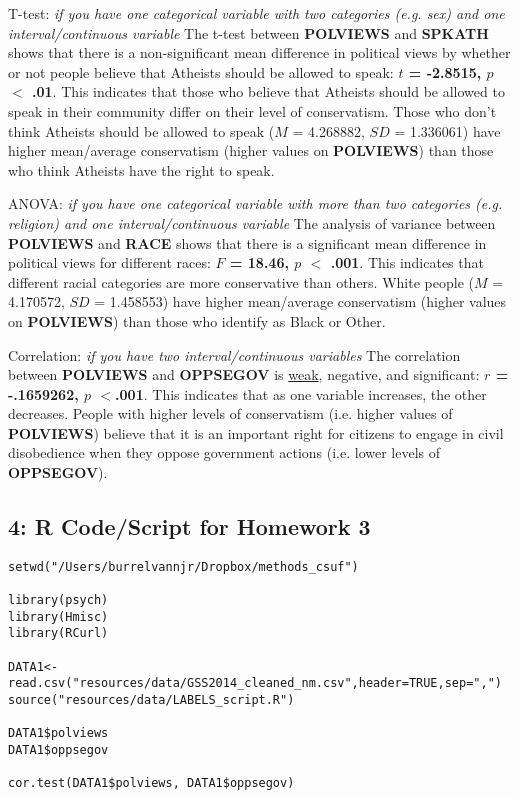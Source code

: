 \documentclass{article}
\begin{document}
T-test: {\it{if you have one categorical variable with two categories (e.g. sex) and one interval/continuous variable}} \newline \newline
The t-test between \textbf{POLVIEWS} and \textbf{SPKATH} shows that there is a non-significant mean difference in political views by whether or not people believe that Atheists should be allowed to speak: \textbf{$t$ = -2.8515, $p$ $< $ .01}. This indicates that those who believe that Atheists should be allowed to speak in their community differ on their level of conservatism. Those who don't think Atheists should be allowed to speak ($M$ = 4.268882, $SD$ = 1.336061) have higher mean/average conservatism (higher values on \textbf{POLVIEWS}) than those who think Atheists have the right to speak.\newline

ANOVA: {\it{if you have one categorical variable with more than two categories (e.g. religion) and one interval/continuous variable}} \newline \newline
The analysis of variance between \textbf{POLVIEWS} and \textbf{RACE} shows that there is a significant mean difference in political views for different races: \textbf{$F$ = 18.46, $p$ $< $ .001}. This indicates that different racial categories are more conservative than others. White people ($M$ = 4.170572, $SD$ = 1.458553) have higher mean/average conservatism (higher values on \textbf{POLVIEWS}) than those who identify as Black or Other.\newline

Correlation: {\it{if you have two interval/continuous variables}} \newline \newline
The correlation between \textbf{POLVIEWS} and \textbf{OPPSEGOV} is \href{http://www.psychology.emory.edu/clinical/bliwise/Tutorials/SCATTER/scatterplots/effect.htm}{weak}, negative, and significant: \textbf{$r$ = -.1659262, $p$ $< $.001}. This indicates that as one variable increases, the other decreases. People with higher levels of conservatism (i.e. higher values of \textbf{POLVIEWS}) believe that it is an important right for citizens to engage in civil disobedience when they oppose government actions (i.e. lower levels of \textbf{OPPSEGOV}).\newline

\newpage

\subsection*{4: R Code/Script for Homework 3}
\begin{verbatim}
setwd("/Users/burrelvannjr/Dropbox/methods_csuf")

library(psych)
library(Hmisc)
library(RCurl)

DATA1<-read.csv("resources/data/GSS2014_cleaned_nm.csv",header=TRUE,sep=",")
source("resources/data/LABELS_script.R")

DATA1$polviews
DATA1$oppsegov

cor.test(DATA1$polviews, DATA1$oppsegov)

\end{verbatim}
\end{document}
